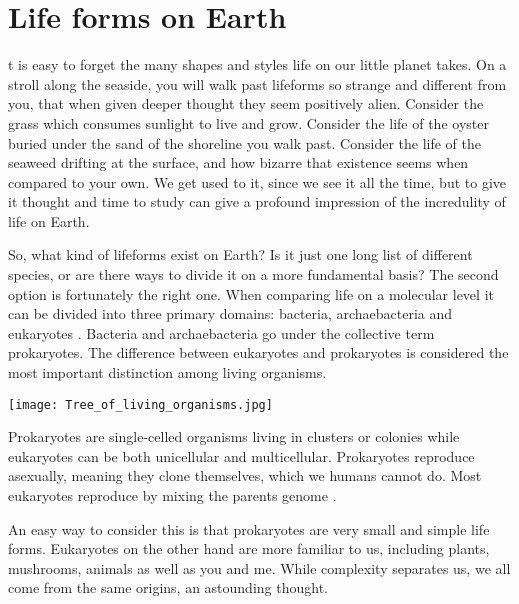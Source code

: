 \section{Life forms on Earth}

t is easy to forget the many shapes and styles life on our little planet takes.
On a stroll along the seaside, you will walk past lifeforms so strange and different from you, that when given deeper thought they seem positively alien.
Consider the grass which consumes sunlight to live and grow.
Consider the life of the oyster buried under the sand of the shoreline you walk past.
Consider the life of the seaweed drifting at the surface, and how bizarre that existence seems when compared to your own.
We get used to it, since we see it all the time, but to give it thought and time to study can give a profound impression of the incredulity of life on Earth.

So, what kind of lifeforms exist on Earth?
Is it just one long list of different species, or are there ways to divide it on a more fundamental basis?
The second option is fortunately the right one.
When comparing life on a molecular level it can be divided into three primary domains: bacteria, archaebacteria and eukaryotes \cite{Eukaryotes}.
Bacteria and archaebacteria go under the collective term prokaryotes.
The difference between eukaryotes and prokaryotes is considered the most important distinction among living organisms. 

\begin{center}
	\texttt{[image: Tree\_of\_living\_organisms.jpg]}
\end{center}

Prokaryotes are single-celled organisms living in clusters or colonies while eukaryotes can be both unicellular and multicellular.
Prokaryotes reproduce asexually, meaning they clone themselves, which we humans cannot do.
Most eukaryotes reproduce by mixing the parents genome \cite{ProcaEuka}. 

An easy way to consider this is that prokaryotes are very small and simple life forms.
Eukaryotes on the other hand are more familiar to us, including plants, mushrooms, animals as well as you and me.
While complexity separates us, we all come from the same origins, an astounding thought.

